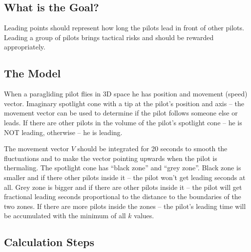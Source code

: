 \documentclass[gap.tex]{subfiles}
\begin{document}
\label{sec:real-leading}

\subsection{What is the Goal?}
Leading points should represent how long the pilots lead in front of other
pilots. Leading a group of pilots brings tactical risks and should be rewarded
appropriately.

\subsection{The Model}
When a paragliding pilot flies in 3D space he has
position and movement (speed) vector. Imaginary spotlight cone with a tip at
the pilot’s position and axis – the movement vector can be used to determine if
the pilot follows someone else or leads. If there are other pilots in the
volume of the pilot’s spotlight cone – he is NOT leading, otherwise – he is
leading.

The movement vector \(V\) should be integrated for 20 seconds to smooth the
fluctuations and to make the vector pointing upwards when the pilot is
thermaling. The spotlight cone has “black zone” and “grey zone”. Black zone is
smaller and if there other pilots inside it – the pilot won’t get leading
seconds at all. Grey zone is bigger and if there are other pilots inside it
– the pilot will get fractional leading seconds proportional to the distance to
the boundaries of the two zones. If there are more pilots inside the zones
– the pilot’s leading time will be accumulated with the minimum of all \(k\)
values.

\subsection{Calculation Steps}
\end{document}
